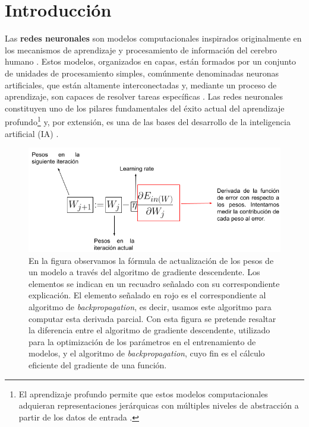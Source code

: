 \section{Introducción}

Las \textbf{redes neuronales} son modelos computacionales inspirados originalmente en los mecanismos de aprendizaje y procesamiento de información del cerebro humano \cite{Mculloch43}. Estos modelos, organizados en capas, están formados por un conjunto de unidades de procesamiento simples, comúnmente denominadas neuronas artificiales, que están altamente interconectadas y, mediante un proceso de aprendizaje, son capaces de resolver tareas específicas \cite{patternrecog, pml1Book, Mostafa2012}. Las redes neuronales constituyen uno de los pilares fundamentales del éxito actual del aprendizaje profundo\footnote{El aprendizaje profundo permite que estos modelos computacionales adquieran representaciones jerárquicas con múltiples niveles de abstracción a partir de los datos de entrada \cite{lecun2015deep, SCHMIDHUBER201585}.} y, por extensión, es una de las bases del desarrollo de la inteligencia artificial (IA) \cite{bishop2023learning, prince2023understanding, 2016modernapp}.

\begin{figure}[H]
    \centering
    \includegraphics[width=0.9\linewidth]{Plantilla_TFG_latex//imagenes//Inf//Int/gd_bp.png}
    \caption[Aclaración de la diferencia entre el algoritmo de gradiente descendente y \textit{backpropagation}]{En la figura observamos la fórmula de actualización de los pesos de un modelo a través del algoritmo de gradiente descendente. Los elementos se indican en un recuadro señalado con su correspondiente explicación. El elemento señalado en rojo es el correspondiente al algoritmo de \textit{backpropagation}, es decir, usamos este algoritmo para computar esta derivada parcial. Con esta figura se pretende resaltar la diferencia entre el algoritmo de gradiente descendente, utilizado para la optimización de los parámetros en el entrenamiento de modelos, y el algoritmo de \textit{backpropagation}, cuyo fin es el cálculo eficiente del gradiente de una función.}
    \label{fig:gd_bp}
\end{figure}

